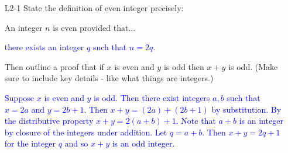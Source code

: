 \documentclass[10pt]{article}
\newcommand{\bs}{\begin{solution}}
\begin{document}
\begin{itemize}
\vfill
\newpage


\item[L2-1] State the definition of even integer precisely:

An integer $n$ is even provided that...

\bs\textcolor{blue}{ there exists an integer $q$ such that $n=2q$.}\end{solution}

\vfill
 Then outline a proof that if $x$ is even and $y$ is odd then $x+y$ is odd. (Make sure to include key details - like what things are integers.)
 
 \bs\textcolor{blue}{Suppose $x$ is even and $y$ is odd. Then there exist integers $a,b$ such that $x=2a$ and $y=2b+1$. Then $x+y=(2a)+(2b+1)$ by substitution. By the distributive property $x+y=2(a+b)+1$. Note that $a+b$ is an integer by closure of the integers under addition. Let $q=a+b$. Then $x+y=2q+1$ for the integer $q$ and so $x+y$ is an odd integer.}\end{solution}
\vfill
\vfill
\vfill
\vfill
\end{itemize}
	
\end{document}
